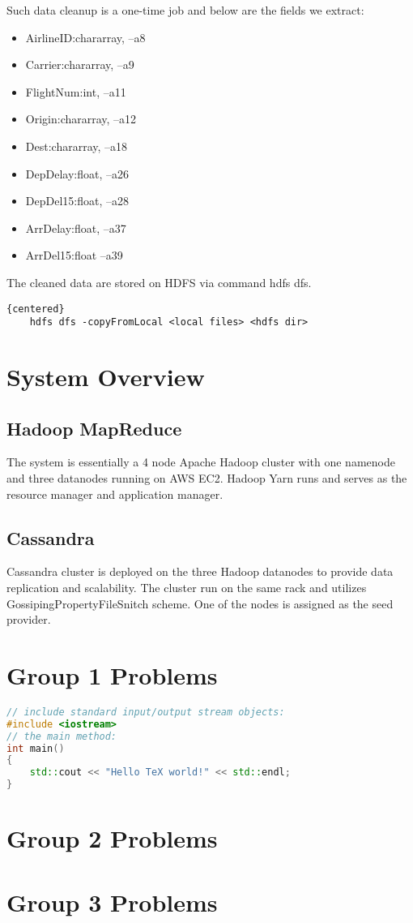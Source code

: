 \documentclass[fontsize=11pt,paper=a4,pagesize=auto]{scrbook}
\begin{document}
\par Such data cleanup is a one-time job and below are the fields we extract: 
\begin{itemize}
\item       AirlineID:chararray, --a8
\item       Carrier:chararray,   --a9
\item       FlightNum:int,       --a11
\item       Origin:chararray,    --a12       
\item       Dest:chararray,      --a18
\item       DepDelay:float,      --a26
\item       DepDel15:float,      --a28
\item       ArrDelay:float,      --a37 
\item       ArrDel15:float       --a39
\end{itemize}

\par The cleaned data are stored on HDFS via command hdfs dfs. 
\begin{lstlisting}{centered}
	hdfs dfs -copyFromLocal <local files> <hdfs dir>  
\end{lstlisting}

 
\section{System Overview}
\subsection{Hadoop MapReduce}
The system is essentially a 4 node Apache Hadoop cluster with one namenode and three datanodes running on AWS EC2. 
Hadoop Yarn runs and serves as the resource manager and application manager.

\subsection{Cassandra} 
Cassandra cluster is deployed on the three Hadoop datanodes to provide data replication and scalability. 
The cluster run on the same rack and utilizes GossipingPropertyFileSnitch scheme. One of the nodes is assigned as the seed provider.
 
\section{Group 1 Problems} 
\begin{lstlisting}[language = C++]
// include standard input/output stream objects:
#include <iostream>
// the main method:
int main()
{
    std::cout << "Hello TeX world!" << std::endl;
}
\end{lstlisting}
 
\section{Group 2 Problems}
 

\blindtext

\section{Group 3 Problems}
 

\blindtext

 
\end{document}
